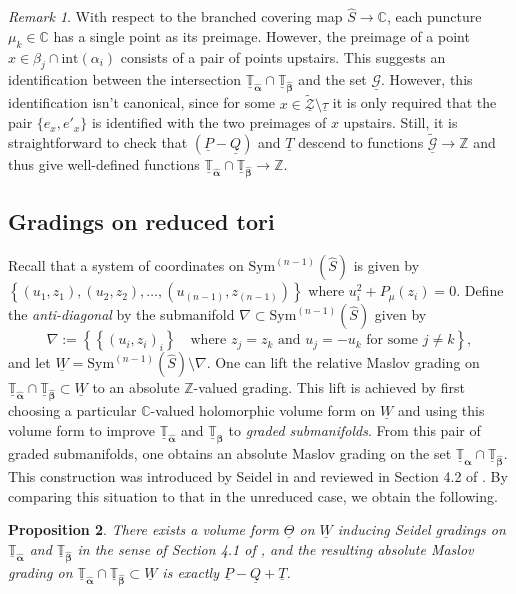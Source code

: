 \documentclass[11pt]{article}
\theoremstyle{plain} \newtheorem{thm}{Theorem}[subsection]
\theoremstyle{plain} \newtheorem{cor}[thm]{Corollary}
\theoremstyle{plain} \newtheorem{prop}[thm]{Proposition}
\theoremstyle{plain} \newtheorem{conj}[thm]{Conjecture}
\theoremstyle{plain} \newtheorem{lem}[thm]{Lemma}
\theoremstyle{definition} \newtheorem{df}[thm]{Definition}
\theoremstyle{remark} \newtheorem{rmk}[thm]{Remark}
\theoremstyle{remark} \newtheorem{obs}[thm]{Observation}
\newcommand{\Ztil}{\tld{\mathcal{Z}}}
\newcommand{\G}{\mathcal{G}}
\newcommand{\tld}[1]{\widetilde{#1}}
\newcommand{\Gtil}{\tld{\mathcal{G}}}
\newcommand{\red}[1]{\underline{#1}}
\newcommand{\ba}{\boldsymbol{\alpha}}
\newcommand{\bb}{\boldsymbol{\beta}}
\newcommand{\bah}{\widehat{\ba}}
\newcommand{\bbh}{\widehat{\bb}}
\newcommand{\Tahr}{\red{\mathbb{T}}_{\bah}}
\newcommand{\Tbhr}{\red{\mathbb{T}}_{\bbh}}
\newcommand{\AD}{\nabla}
\numberwithin{equation}{section}
\begin{document}
\begin{rmk}
With respect to the branched covering map $\widehat{S} \rightarrow \mathbb{C}$, each puncture $\mu_{k} \in \mathbb{C}$ has a single point as its preimage.  However, the preimage of a point $x \in \beta_{j} \cap \text{int}(\alpha_{i})$ consists of a pair of points upstairs.  This suggests an identification between the intersection $\Tahr \cap \Tbhr$ and the set $\red{\G}$.  However, this identification isn't canonical, since for some $x \in \red{\Ztil} \setminus \red{\tau}$ it is only required that the pair $\{ e_{x}, e'_{x} \}$ is identified with the two preimages of $x$ upstairs.  Still, it is straightforward to check that $\left(\red{P}-\red{Q}\right)$ and $\red{T}$ descend to functions $\red{\Gtil} \rightarrow \mathbb{Z}$ and thus give well-defined functions $\Tahr \cap \Tbhr \rightarrow \mathbb{Z}$.
\end{rmk}

\subsection{Gradings on reduced tori}\label{sec:redmas}

Recall that a system of coordinates on $\text{Sym}^{(n-1)}(\widehat{S})$ is given by $\left\{ (u_1,z_1), (u_2,z_2), \ldots, (u_{(n-1)},z_{(n-1)}) \right\}$ where $u_i^2 + P_{\mu}(z_i) = 0$. Define the \emph{anti-diagonal} by the submanifold $\AD \subset \text{Sym}^{(n-1)}(\widehat{S})$ given by
$$ \AD := \left\{  \left\{ \left(u_i,z_i\right)_i \right\} \quad \text{where $z_j = z_k$ and $u_j = - u_k$ for some $j \neq k$}   \right\},$$
and let $\red{W} = \text{Sym}^{(n-1)}(\widehat{S}) \setminus \AD$.   One can lift the relative Maslov grading on $\Tahr \cap \Tbhr \subset \red{W}$ to an absolute $\mathbb{Z}$-valued grading.  This lift is achieved by first choosing a particular $\mathbb{C}$-valued holomorphic volume form on $\red{W}$ and using this volume form to improve $\Tahr$ and $\Tbhr$ to \emph{graded submanifolds}.  From this pair of graded submanifolds, one obtains an absolute Maslov grading on the set $\Tahr \cap \Tbhr$.  This construction was introduced by Seidel in \cite{s:GL} and reviewed in Section 4.2 of \cite{et:R}.  By comparing this situation to that in the unreduced case, we obtain the following.

\begin{prop}\label{prop:cmRred}
There exists a volume form $\red{\Theta}$ on $\red{W}$ inducing Seidel gradings on $\Tahr$ and $\Tbhr$ in the sense of Section 4.1 of \cite{et:R}, and the resulting absolute Maslov grading on $\Tahr \cap \Tbhr \subset \red{W}$ is exactly $\red{ P} - \red{Q} + \red{T}$.
\end{prop}
\end{document}
